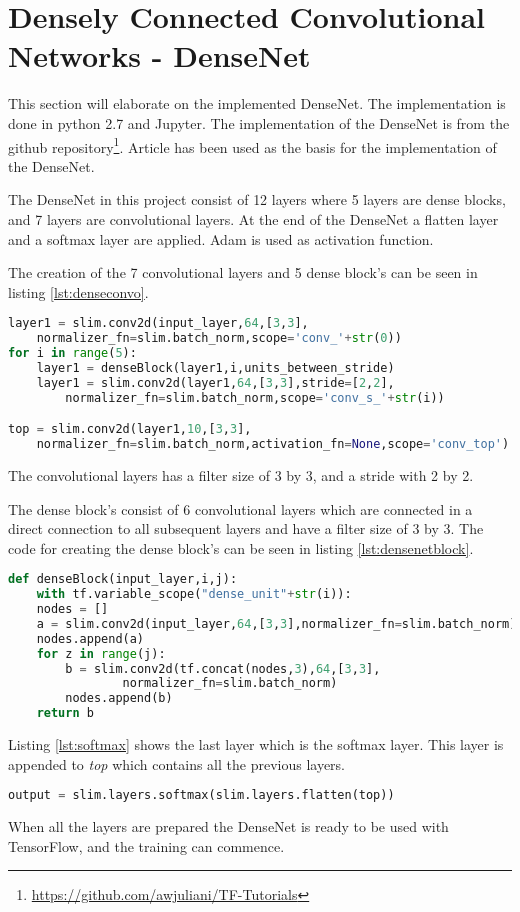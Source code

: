 \section{Densely Connected Convolutional Networks - DenseNet}

This section will elaborate on the implemented DenseNet. The implementation is done in python 2.7 and Jupyter. The implementation of the DenseNet is from the github repository\footnote{\url{https://github.com/awjuliani/TF-Tutorials}}. Article \citep{DENSE} has been used as the basis for the implementation of the DenseNet.

The DenseNet in this project consist of 12 layers where 5 layers are dense blocks, and 7 layers are convolutional layers. At the end of the DenseNet a flatten layer and a softmax layer are applied. Adam is used as activation function.

The creation of the 7 convolutional layers and 5 dense block's can be seen in listing \ref{lst:denseconvo}.

\begin{lstlisting}[language=Python, label=lst:denseconvo, caption=for loop which creates the dense block's mixed with the convolutional layers]
layer1 = slim.conv2d(input_layer,64,[3,3],
	normalizer_fn=slim.batch_norm,scope='conv_'+str(0))
for i in range(5):
	layer1 = denseBlock(layer1,i,units_between_stride)
	layer1 = slim.conv2d(layer1,64,[3,3],stride=[2,2],
		normalizer_fn=slim.batch_norm,scope='conv_s_'+str(i))

top = slim.conv2d(layer1,10,[3,3],
	normalizer_fn=slim.batch_norm,activation_fn=None,scope='conv_top')
\end{lstlisting}

The convolutional layers has a filter size of 3 by 3, and a stride with 2 by 2. 

The dense block's consist of 6 convolutional layers which are connected in a direct connection to all subsequent layers and have a filter size of 3 by 3. The code for creating the dense block's can be seen in listing \ref{lst:densenetblock}.

\begin{lstlisting}[language=Python, label=lst:densenetblock, caption=DenseNet Block function]
def denseBlock(input_layer,i,j):
	with tf.variable_scope("dense_unit"+str(i)):
	nodes = []
	a = slim.conv2d(input_layer,64,[3,3],normalizer_fn=slim.batch_norm)
	nodes.append(a)
	for z in range(j):
		b = slim.conv2d(tf.concat(nodes,3),64,[3,3],
				normalizer_fn=slim.batch_norm)
		nodes.append(b)
	return b
\end{lstlisting}

Listing \ref{lst:softmax} shows the last layer which is the softmax layer. This layer is appended to \emph{top} which contains all the previous layers.

\begin{lstlisting}[language=Python, label=lst:softmax, caption=Softmax layer appended to the end of the DenseNet]
output = slim.layers.softmax(slim.layers.flatten(top))
\end{lstlisting}

When all the layers are prepared the DenseNet is ready to be used with TensorFlow, and the training can commence.
